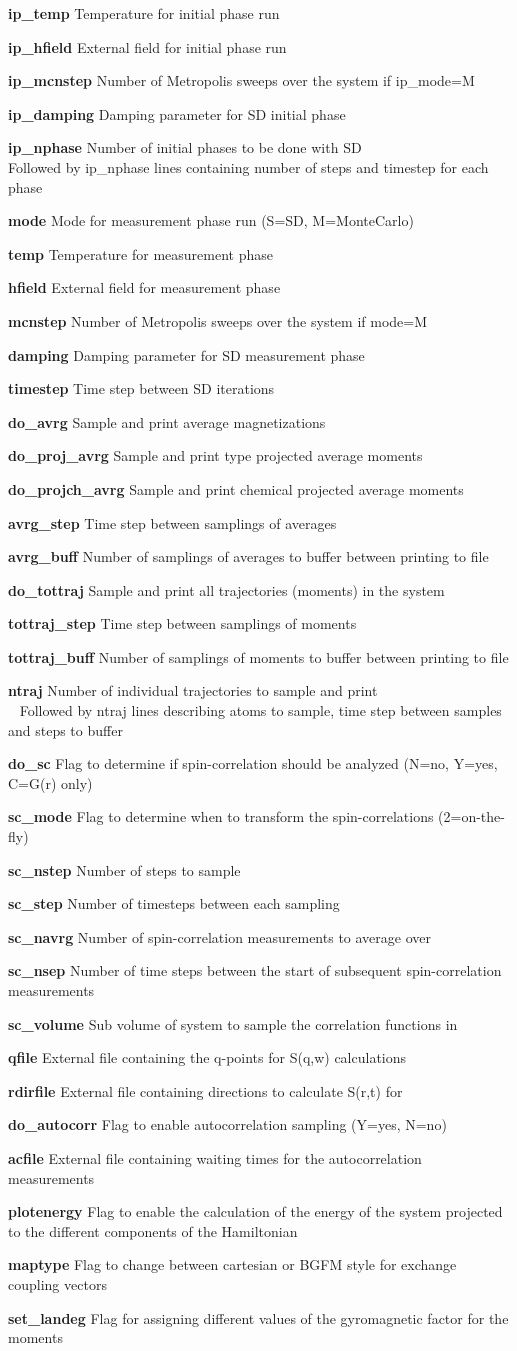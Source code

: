 \documentclass{article}
\newcommand\litem[1]{\item{\bfseries #1\enspace}}
\begin{document}
\begin{description}
\litem{ip\_temp} Temperature for initial phase run
\litem{ip\_hfield} External field for initial phase run
\litem{ip\_mcnstep} Number of Metropolis sweeps over the system if ip\_mode=M
\litem{ip\_damping} Damping parameter for SD initial phase
\litem{ip\_nphase} Number of initial phases to be done with SD \\
Followed by ip\_nphase lines containing number of steps and timestep for each phase
\litem{mode} Mode for measurement phase run (S=SD, M=MonteCarlo)
\litem{temp} Temperature for measurement phase
\litem{hfield} External field for measurement phase
\litem{mcnstep} Number of Metropolis sweeps over the system if mode=M
\litem{damping} Damping parameter for SD measurement phase
\litem{timestep} Time step between SD iterations
\litem{do\_avrg} Sample and print average magnetizations
\litem{do\_proj\_avrg} Sample and print type projected average moments
\litem{do\_projch\_avrg} Sample and print chemical projected average moments
\litem{avrg\_step} Time step between samplings of averages
\litem{avrg\_buff} Number of samplings of averages to buffer between printing to file
\litem{do\_tottraj} Sample and print all trajectories (moments) in the system
\litem{tottraj\_step} Time step between samplings of moments
\litem{tottraj\_buff} Number of samplings of moments to buffer between printing to file
\litem{ntraj} Number of individual trajectories to sample and print \\ 
Followed by ntraj lines describing atoms to sample, time step between samples and steps to buffer
\litem{do\_sc} Flag to determine if spin-correlation should be analyzed (N=no, Y=yes, C=G(r) only)
\litem{sc\_mode} Flag to determine when to transform the spin-correlations (2=on-the-fly)
\litem{sc\_nstep} Number of steps to sample
\litem{sc\_step} Number of timesteps between each sampling
\litem{sc\_navrg} Number of spin-correlation measurements to average over
\litem{sc\_nsep} Number of time steps between the start of subsequent spin-correlation measurements
\litem{sc\_volume} Sub volume of system to sample the correlation functions in
\litem{qfile} External file containing the q-points for S(q,w) calculations
\litem{rdirfile} External file containing directions to calculate S(r,t) for
\litem{do\_autocorr} Flag to enable autocorrelation sampling (Y=yes, N=no)
\litem{acfile} External file containing waiting times for the autocorrelation measurements
\litem{plotenergy} Flag to enable the calculation of the energy of the system projected to the different components of the Hamiltonian
\litem{maptype} Flag to change between cartesian or BGFM style for exchange coupling vectors
\litem{set\_landeg} Flag for assigning different values of the gyromagnetic factor for the moments
\end{description}
\end{document}
